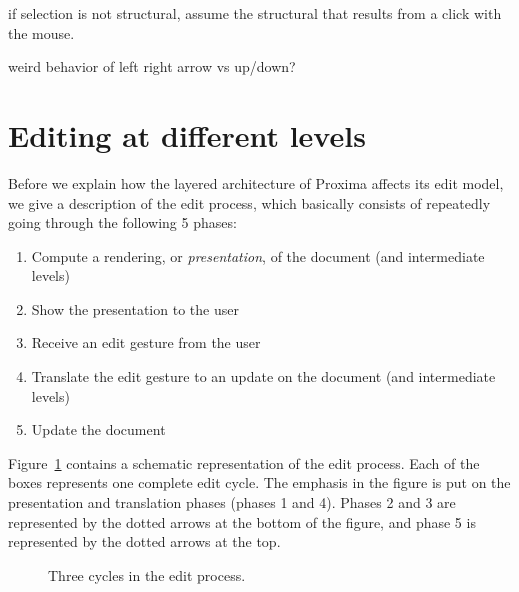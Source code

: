 if selection is not structural, assume the structural that results from a click with the mouse.

weird behavior of left right arrow vs up/down? 
\ec


%																
%																
%																
\section{Editing at different levels}

Before we explain how the layered architecture of Proxima affects its edit model, we give a description of the edit process, which basically consists of repeatedly going through the following 5 phases:

\begin{enumerate}
\item Compute a rendering, or {\it presentation}, of the document (and intermediate levels)
\item Show the presentation to the user
\item Receive an edit gesture from the user
\item Translate the edit gesture to an update on the document (and intermediate levels)
\item Update the document
\end{enumerate}

Figure~\ref{simpleeditprocess} contains a schematic representation of the edit process. Each of the boxes represents one complete edit cycle. The emphasis in the figure is put on the presentation and translation phases (phases 1 and 4). Phases 2 and 3 are represented by the dotted arrows at the bottom of the figure, and phase 5 is represented by the dotted arrows at the top.

\begin{figure}
\begin{small}
\begin{center}
\begin{center}
\begin{scriptsize}
\end{scriptsize}
\end{center}\caption{Three cycles in the edit process.}\label{simpleeditprocess} 
\end{center}
\end{small}
\end{figure}

